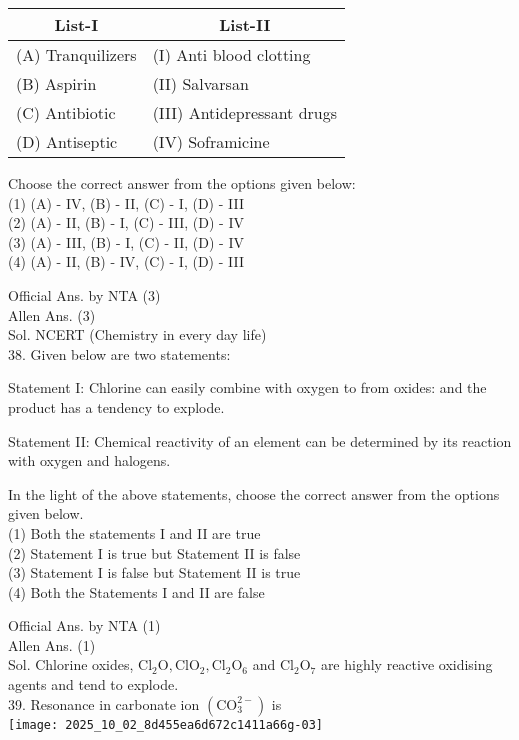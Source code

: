 \documentclass[10pt]{article}
\begin{document}
\begin{center}
\begin{tabular}{|l|l|}
\hline
\multicolumn{1}{|c|}{List-I} & \multicolumn{1}{c|}{List-II} \\
\hline
(A) Tranquilizers & (I) Anti blood clotting \\
\hline
(B) Aspirin & (II) Salvarsan \\
\hline
(C) Antibiotic & (III) Antidepressant drugs \\
\hline
(D) Antiseptic & (IV) Soframicine \\
\hline
\end{tabular}
\end{center}

Choose the correct answer from the options given below:\\
(1) (A) - IV, (B) - II, (C) - I, (D) - III\\
(2) (A) - II, (B) - I, (C) - III, (D) - IV\\
(3) (A) - III, (B) - I, (C) - II, (D) - IV\\
(4) (A) - II, (B) - IV, (C) - I, (D) - III

Official Ans. by NTA (3)\\
Allen Ans. (3)\\
Sol. NCERT (Chemistry in every day life)\\
38. Given below are two statements:

Statement I: Chlorine can easily combine with oxygen to from oxides: and the product has a tendency to explode.

Statement II: Chemical reactivity of an element can be determined by its reaction with oxygen and halogens.

In the light of the above statements, choose the correct answer from the options given below.\\
(1) Both the statements I and II are true\\
(2) Statement I is true but Statement II is false\\
(3) Statement I is false but Statement II is true\\
(4) Both the Statements I and II are false

Official Ans. by NTA (1)\\
Allen Ans. (1)\\
Sol. Chlorine oxides, \(\mathrm{Cl}_{2} \mathrm{O}, \mathrm{ClO}_{2}, \mathrm{Cl}_{2} \mathrm{O}_{6}\) and \(\mathrm{Cl}_{2} \mathrm{O}_{7}\) are highly reactive oxidising agents and tend to explode.\\
39. Resonance in carbonate ion \(\left(\mathrm{CO}_{3}^{2-}\right)\) is\\
\texttt{[image: 2025\_10\_02\_8d455ea6d672c1411a66g-03]}
\end{document}

